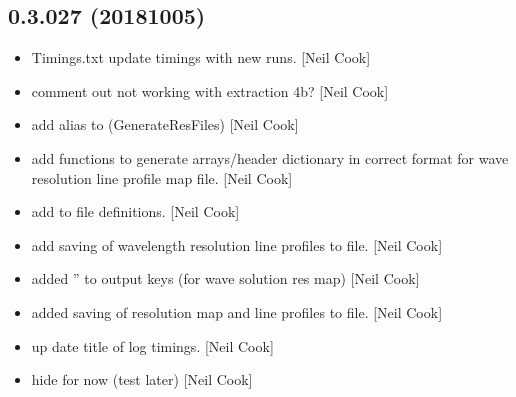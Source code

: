 \documentclass[a4paper,10pt,english]{report}
\begin{document}
\subsection{0.3.027 (2018\sphinxhyphen{}10\sphinxhyphen{}05)}
\label{\detokenize{misc/changelog:id324}}\begin{itemize}
\item {} 
Timings.txt \sphinxhyphen{} update timings with new runs. {[}Neil Cook{]}

\item {} 
 \sphinxhyphen{} comment out  \sphinxhyphen{} not working with
extraction 4b? {[}Neil Cook{]}

\item {} 
 \sphinxhyphen{} add alias to 
(GenerateResFiles) {[}Neil Cook{]}

\item {} 
 \sphinxhyphen{} add  functions to generate
arrays/header dictionary in correct format for wave resolution line
profile map file. {[}Neil Cook{]}

\item {} 
 \sphinxhyphen{} add  to file definitions. {[}Neil Cook{]}

\item {} 
 \sphinxhyphen{} add saving of wavelength resolution line
profiles to file. {[}Neil Cook{]}

\item {} 
 \sphinxhyphen{} added ” to output keys (for wave solution
res map) {[}Neil Cook{]}

\item {} 
 \sphinxhyphen{} added saving of resolution map and line
profiles to file. {[}Neil Cook{]}

\item {} 
 \sphinxhyphen{} up date title of log timings. {[}Neil Cook{]}

\item {} 
 \sphinxhyphen{} hide   for now (test later) {[}Neil
Cook{]}


\end{itemize}
\end{document}
